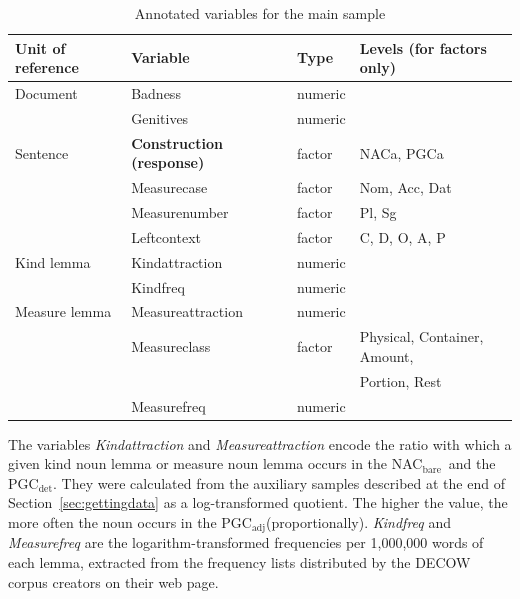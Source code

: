 \documentclass[USenglish]{article}
\newcommand{\Sub}[1]{\ensuremath{\mathrm{_{#1}}}}
\newcommand{\NACb}{NAC\Sub{bare}}
\newcommand{\PGCd}{PGC\Sub{det}}
\newcommand{\PGCa}{PGC\Sub{adj}}
\begin{document}
\begin{table}
  \centering
  \begin{tabular}{llll}
    Unit of reference & Variable                      & Type    & Levels (for factors only)    \\
    \midrule
    Document       & Badness                          & numeric &                              \\
                   & Genitives                        & numeric &                              \\
    Sentence       & \textbf{Construction (response)} & factor  & NACa, PGCa                   \\
                   & Measurecase                      & factor  & Nom, Acc, Dat                \\
                   & Measurenumber                    & factor  & Pl, Sg                       \\
                   & Leftcontext                      & factor  & C, D, O, A, P                \\
    Kind lemma     & Kindattraction                   & numeric &                              \\
                   & Kindfreq                         & numeric &                              \\
    Measure lemma  & Measureattraction                & numeric &                              \\
                   & Measureclass                     & factor  & Physical, Container, Amount, \\
                   &                                  &         & Portion, Rest                \\
                   & Measurefreq                      & numeric &                              \\
  \end{tabular}
  \caption{Annotated variables for the main sample}
  \label{tab:variables}
\end{table}

The variables \textit{Kindattraction} and \textit{Measureattraction} encode the ratio with which a given kind noun lemma or measure noun lemma occurs in the \NACb\ and the \PGCd.
They were calculated from the auxiliary samples described at the end of Section~\ref{sec:gettingdata} as a log-transformed quotient.
The higher the value, the more often the noun occurs in the \PGCa (proportionally).
\textit{Kindfreq} and \textit{Measurefreq} are the logarithm-transformed frequencies per 1,000,000 words of each lemma, extracted from the frequency lists distributed by the DECOW corpus creators on their web page.
\end{document}
